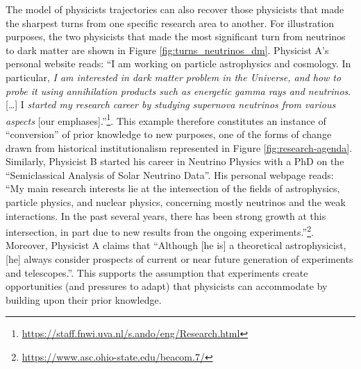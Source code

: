 \documentclass{article}
\begin{document}
The model of physicists trajectories can also recover those physicists that made the sharpest turns from one specific research area to another. For illustration purposes, the two physicists that made the most significant turn from neutrinos to dark matter are shown in Figure \ref{fig:turns_neutrinos_dm}. Physicist A's personal website reads: ``I am working on particle astrophysics and cosmology. In particular, \textit{I am interested in dark matter problem in the Universe, and how to probe it using annihilation products such as energetic gamma rays and neutrinos}. [\dots]  I \textit{started my research career by studying supernova neutrinos from various aspects} [our emphases].''\footnote{\url{https://staff.fnwi.uva.nl/s.ando/eng/Research.html}}. This example therefore constitutes an instance of ``conversion'' of prior knowledge to new purposes, one of the forms of change drawn from historical institutionalism represented in Figure \ref{fig:research-agenda}. Similarly, Physicist B started his career in Neutrino Physics with a PhD on the ``Semiclassical Analysis of Solar Neutrino Data''.  His personal webpage reads: ``My main research interests lie at the intersection of the fields of astrophysics, particle physics, and nuclear physics, concerning mostly neutrinos and the weak interactions. In the past several years, there has been strong growth at this intersection, in part due to new results from the ongoing experiments.''\footnote{\url{https://www.asc.ohio-state.edu/beacom.7/}}. Moreover, Physicist A claims that ``Although [he is] a theoretical astrophysicist, [he] always consider prospects of current or near future generation of experiments and telescopes.''. This supports the assumption that experiments create opportunities (and pressures to adapt) that physicists can accommodate by building upon their prior knowledge. 
\end{document}
